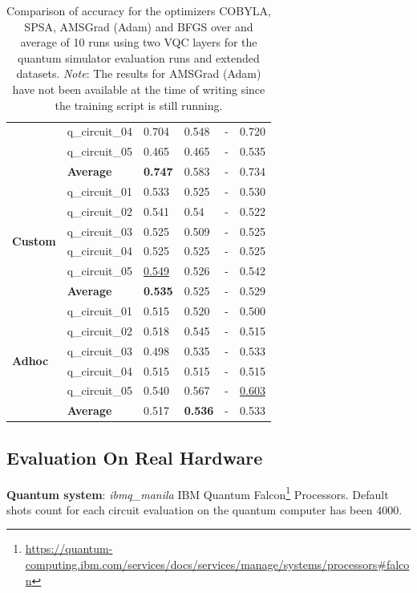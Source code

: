 \begin{table}[!h]
{\begin{tabular}{p{}p{}|p{}p{}p{}p{}}
    		                        & q\_circuit\_04 & 0.704  & 0.548 & -   & 0.720 \\
    		                        & q\_circuit\_05 & 0.465  & 0.465 & -   & 0.535 \\
    		\cline{2-6} 
    		                        & \textbf{Average} & \textbf{0.747}  & 0.583 & -   & 0.734 \\
    		\hline
    		\multirow{6}{*}{\textbf{Custom}} & q\_circuit\_01 & 0.533  & 0.525 & -   & 0.530 \\
    		                        & q\_circuit\_02 & 0.541  & 0.54 & -   & 0.522 \\
    		                        & q\_circuit\_03 & 0.525  & 0.509 & -   & 0.525 \\
    		                        & q\_circuit\_04 & 0.525  & 0.525 & -  & 0.525 \\
    		                        & q\_circuit\_05 & \underline{0.549}  & 0.526 & -   & 0.542 \\
    		\cline{2-6} 
    		                        & \textbf{Average} & \textbf{0.535} & 0.525 & -   & 0.529 \\
    		\hline 
    		\multirow{6}{*}{\textbf{Adhoc}}   & q\_circuit\_01 & 0.515  & 0.520 & -   & 0.500 \\
    		                        & q\_circuit\_02 & 0.518  & 0.545 & -   & 0.515 \\
    		                        & q\_circuit\_03 & 0.498  & 0.535 & -   & 0.533 \\
    		                        & q\_circuit\_04 & 0.515  & 0.515 & -   & 0.515 \\
    		                        & q\_circuit\_05 & 0.540  & 0.567 & -   & \underline{0.603} \\
    		\cline{2-6} 
    		                        & \textbf{Average} & 0.517  & \textbf{0.536} & -   & 0.533 \\
    		\hline 
    	\end{tabular}
	}
	\caption{Comparison of accuracy for the optimizers COBYLA, SPSA, AMSGrad (Adam) and BFGS over and average of 10 runs using two VQC layers for the quantum simulator evaluation runs and extended datasets. \textit{Note}: The results for AMSGrad (Adam) have not been available at the time of writing since the training script is still running.}
	\label{table:accuracy_comparison_extended_dataset_and_optimizers_simulator_runs}
\end{table}

\clearpage
\subsection{Evaluation On Real Hardware}
\label{subsection:qnn_evaluation_on_real_hardware}
\textbf{Quantum system}: \textit{ibmq\_manila} IBM Quantum Falcon\footnote{\url{https://quantum-computing.ibm.com/services/docs/services/manage/systems/processors#falcon}} Processors. Default shots count for each circuit evaluation on the quantum computer has been $4000$.

